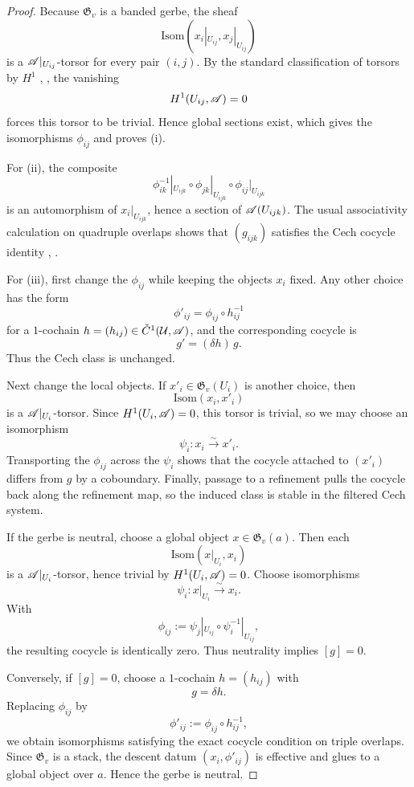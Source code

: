 \begin{proof}
Because $\mathfrak G_v$ is a banded gerbe, the sheaf
\[
\mathrm{Isom}(x_i|_{U_{ij}},x_j|_{U_{ij}})
\]
is a $\mathscr{A}|_{U_{ij}}$-torsor for every pair $(i,j)$. By the standard classification of torsors by $H^1$ \cite[Chap.~III]{MacLaneMoerdijk1994}, \cite[Sec.~11]{StacksProject}, the vanishing
\[
H^1(U_{ij},\mathscr{A})=0
\]
forces this torsor to be trivial. Hence global sections exist, which gives the isomorphisms $\phi_{ij}$ and proves \textup{(i)}.

For \textup{(ii)}, the composite
\[
\phi_{ik}^{-1}|_{U_{ijk}}\circ \phi_{jk}|_{U_{ijk}}\circ \phi_{ij}|_{U_{ijk}}
\]
is an automorphism of $x_i|_{U_{ijk}}$, hence a section of $\mathscr{A}(U_{ijk})$. The usual associativity calculation on quadruple overlaps shows that $(g_{ijk})$ satisfies the Cech cocycle identity \cite[Chap.~IV]{Giraud1971}, \cite[Sec.~11]{StacksProject}.

For \textup{(iii)}, first change the $\phi_{ij}$ while keeping the objects $x_i$ fixed. Any other choice has the form
\[
\phi'_{ij}=\phi_{ij}\circ h_{ij}^{-1}
\]
for a $1$-cochain $h=(h_{ij})\in \check C^1(\mathcal U,\mathscr{A})$, and the corresponding cocycle is
\[
g'=(\delta h)\, g.
\]
Thus the Cech class is unchanged.

Next change the local objects. If $x'_i\in \mathfrak G_v(U_i)$ is another choice, then
\[
\mathrm{Isom}(x_i,x'_i)
\]
is a $\mathscr{A}|_{U_i}$-torsor. Since $H^1(U_i,\mathscr{A})=0$, this torsor is trivial, so we may choose an isomorphism
\[
\psi_i:x_i\xrightarrow{\sim} x'_i.
\]
Transporting the $\phi_{ij}$ across the $\psi_i$ shows that the cocycle attached to $(x'_i)$ differs from $g$ by a coboundary. Finally, passage to a refinement pulls the cocycle back along the refinement map, so the induced class is stable in the filtered Cech system.

If the gerbe is neutral, choose a global object $x\in \mathfrak G_v(a)$. Then each
\[
\mathrm{Isom}(x|_{U_i},x_i)
\]
is a $\mathscr{A}|_{U_i}$-torsor, hence trivial by $H^1(U_i,\mathscr{A})=0$. Choose isomorphisms
\[
\psi_i:x|_{U_i}\xrightarrow{\sim} x_i.
\]
With
\[
\phi_{ij}:=\psi_j|_{U_{ij}}\circ \psi_i^{-1}|_{U_{ij}},
\]
the resulting cocycle is identically zero. Thus neutrality implies $[g]=0$.

Conversely, if $[g]=0$, choose a $1$-cochain $h=(h_{ij})$ with
\[
g=\delta h.
\]
Replacing $\phi_{ij}$ by
\[
\phi'_{ij}:=\phi_{ij}\circ h_{ij}^{-1},
\]
we obtain isomorphisms satisfying the exact cocycle condition on triple overlaps. Since $\mathfrak G_v$ is a stack, the descent datum $(x_i,\phi'_{ij})$ is effective and glues to a global object over $a$. Hence the gerbe is neutral.
\end{proof}

